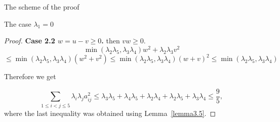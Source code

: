 \documentclass[12pt]{article}
\begin{document}
\begin{section}{The scheme of the proof}
\begin{section}{The case  \texorpdfstring{$\lambda_{1} = 0$}{Lg}}
\begin{proof}
    \textbf{Case  2.2 $w = u-v \geq 0$.} then $vw\geq 0.$
    $$
        \min(\lambda_{2}\lambda_{5},\lambda_{3}\lambda_{4} )w^{2} + \lambda_{2}\lambda_{3}v^{2}     
        $$
        $$\leq \min(\lambda_{2}\lambda_{5},\lambda_{3}\lambda_{4} )(w^{2} + v^{2}) \leq \min(\lambda_{2}\lambda_{5},\lambda_{3}\lambda_{4} )(w + v)^{2} \leq \min(\lambda_{2}\lambda_{5},\lambda_{3}\lambda_{4} )
    $$

     Therefore we get
    
    $$
        \sum_{1\leq i < j\leq 5}\lambda_{i}\lambda_{j} a_{ij}^{2} \leq \lambda_{3}\lambda_{5} + \lambda_{4}\lambda_{5} + \lambda_{2}\lambda_{4} + \lambda_{2}\lambda_{5} + \lambda_{3}\lambda_{4}\leq \frac{9}{5},
    $$
    where the last inequality was obtained using Lemma~\ref{lemma3.5}.

\end{proof}
    
\end{section}

\end{section}
\end{document}
